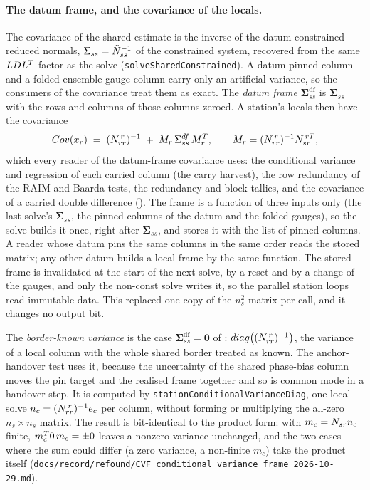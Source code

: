 \documentclass[main.tex]{subfiles}
\begin{document}
\paragraph{The datum frame, and the covariance of the locals.}
The covariance of the shared estimate is the inverse of the
datum-constrained reduced normals,
$\Sigma_{ss} = \tilde{N}_{ss}^{-1}$ of the constrained system, recovered
from the same $LDL^{T}$ factor as the solve
(\texttt{solveSharedConstrained}). A datum-pinned column and a folded
ensemble gauge column carry only an artificial variance, so the
consumers of the covariance treat them as exact. The \emph{datum frame}
$\bm{\Sigma}^{\mathrm{df}}_{ss}$ is $\bm{\Sigma}_{ss}$ with the rows and
columns of those columns zeroed. A station's locals then have the
covariance
\begin{equation}
Cov(x_{r}) \;=\;
   (N_{rr}^{\,r})^{-1} \;+\; M_r\,
   \Sigma^{df}_{ss}\,M_r^{T},
\qquad
M_r = (N_{rr}^{\,r})^{-1}N_{sr}^{\,rT},
\label{eq:net-local-cov}
\end{equation}
which every reader of the datum-frame covariance uses: the conditional variance and
regression of each carried column (the carry harvest), the row
redundancy of the RAIM and Baarda tests, the redundancy and block
tallies, and the covariance of a carried double difference
().
The frame is a function of three inputs only (the last solve's
$\bm{\Sigma}_{ss}$, the pinned columns of the datum and the folded
gauges), so the solve builds it once, right after $\bm{\Sigma}_{ss}$, and
stores it with the list of pinned columns. A reader whose datum pins
the same columns in the same order reads the stored matrix; any other
datum builds a local frame by the same function. The stored frame is
invalidated at the start of the next solve, by a reset and by a change of
the gauges, and only the non-const solve writes it, so the parallel
station loops read immutable data. This replaced one copy of the $n_s^2$
matrix per call, and it changes no output bit.

The \emph{border-known variance} is the case $\bm{\Sigma}^{\mathrm{df}}_{ss}
= \bm{0}$ of : $diag\big((N_{rr}^{\,r})^{-1}\big)$,
the variance of a local column with the whole shared border treated as
known. The anchor-handover test uses it, because the uncertainty of the
shared phase-bias column moves the pin target and the realised frame
together and so is common mode in a handover step. It is computed by
\texttt{stationConditionalVarianceDiag}, one local solve $n_c =
(N_{rr}^{\,r})^{-1}e_c$ per column, without forming or multiplying the
all-zero $n_s\times n_s$ matrix. The result is bit-identical to the
product form: with $m_c = N_{sr} n_c$ finite, $m_c^{T}0\,m_c = \pm 0$
leaves a nonzero variance unchanged, and the two cases where the sum
could differ (a zero variance, a non-finite $m_c$) take the product
itself (\texttt{docs/record/refound/CVF\_conditional\_variance\_frame\_2026-10-29.md}).
\end{document}
